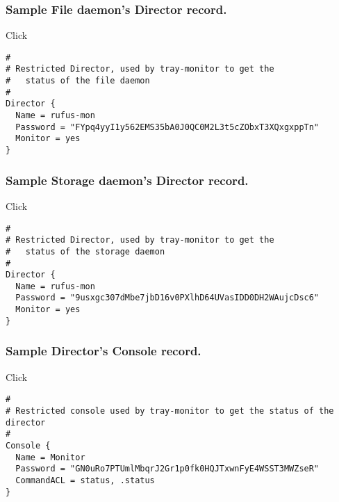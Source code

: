 \subsubsection*{Sample File daemon's Director record.}

Click 


\footnotesize
\begin{verbatim}
#
# Restricted Director, used by tray-monitor to get the
#   status of the file daemon
#
Director {
  Name = rufus-mon
  Password = "FYpq4yyI1y562EMS35bA0J0QC0M2L3t5cZObxT3XQxgxppTn"
  Monitor = yes
}
\end{verbatim}
\normalsize

\subsubsection*{Sample Storage daemon's Director record.}

Click 

\footnotesize
\begin{verbatim}
#
# Restricted Director, used by tray-monitor to get the
#   status of the storage daemon
#
Director {
  Name = rufus-mon
  Password = "9usxgc307dMbe7jbD16v0PXlhD64UVasIDD0DH2WAujcDsc6"
  Monitor = yes
}
\end{verbatim}
\normalsize

\subsubsection*{Sample Director's Console record.}

Click 

\footnotesize
\begin{verbatim}
#
# Restricted console used by tray-monitor to get the status of the director
#
Console {
  Name = Monitor
  Password = "GN0uRo7PTUmlMbqrJ2Gr1p0fk0HQJTxwnFyE4WSST3MWZseR"
  CommandACL = status, .status
}
\end{verbatim}
\normalsize
